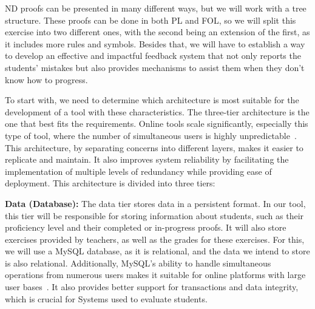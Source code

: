 \gls{ND} proofs can be presented in many different ways, but we will work with a tree structure. These proofs can be done in both \gls{PL} and \gls{FOL}, so we will split this exercise into two different ones, with the second being an extension of the first, as it includes more rules and symbols. Besides that, we will have to establish a way to develop an effective and impactful feedback system that not only reports the students' mistakes but also provides mechanisms to assist them when they don't know how to progress.

To start with, we need to determine which architecture is most suitable for the development of a tool with these characteristics. The three-tier architecture is the one that best fits the requirements. Online tools scale significantly, especially this type of tool, where the number of simultaneous users is highly unpredictable~\cite{kircher_2025_the}. This architecture, by separating concerns into different layers, makes it easier to replicate and maintain. It also improves system reliability by facilitating the implementation of multiple levels of redundancy while providing ease of deployment. This architecture is divided into three tiers:

\textbf{Data (Database):} The data tier stores data in a persistent format. In our tool, this tier will be responsible for storing information about students, such as their proficiency level and their completed or in-progress proofs. It will also store exercises provided by teachers, as well as the grades for these exercises. For this, we will use a MySQL database, as it is relational, and the data we intend to store is also relational. Additionally, MySQL's ability to handle simultaneous operations from numerous users makes it suitable for online platforms with large user bases~\cite{gyordi_2016_a}. It also provides better support for transactions and data integrity, which is crucial for Systems used to evaluate students.
    

